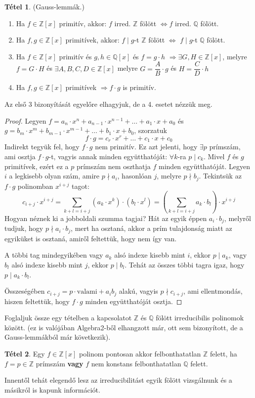 \documentclass[12pt]{book}
\theoremstyle{plain} %
\theoremstyle{definition} %
\newtheorem{theo/}{Tétel}[section]
\newenvironment{theo}
  {\renewcommand{\qedsymbol}{$\clubsuit$}%
   \pushQED{\qed}\begin{theo/}}
  {\popQED\end{theo/}}
\theoremstyle{remark}
\renewcommand\qedsymbol{$\blacksquare$}
\numberwithin{equation}{section}  %
\def\Z{\mathbb{Z}}
\begin{document}
	\begin{theo}\label{gl}
		(Gauss-lemmák.)
		\begin{enumerate}
			\item Ha $f\in \mathbb{Z}[x]$ primitív, akkor: $f$ irred. $\mathbb{Z}$ fölött $\Leftrightarrow f$ irred. $\mathbb{Q}$ fölött.
			\item Ha $f,g\in \mathbb{Z}[x]$ primitívek, akkor: $f\mid g$-t $\mathbb{Z}$ fölött $\Leftrightarrow$ $f\mid g$-t $\mathbb{Q}$ fölött.
			\item Ha $f\in \mathbb{Z}[x]$ primitív és $g,h\in \mathbb{Q}[x]$ és $f=g\cdot h$ $\Rightarrow \exists G,H\in \mathbb{Z}[x]$, melyre $f=G\cdot H$ és $\exists A, B, C, D\in \Z[x]$ melyre $G=\dfrac{A}{B}\cdot g$ és $H=\dfrac{C}{D}\cdot h$
			\item Ha $f,g \in \mathbb{Z}[x]$ primitívek $\Rightarrow f\cdot g$ is primitív.
		\end{enumerate}
	\end{theo}
	Az első 3 bizonyítását egyelőre elhagyjuk, de a 4. esetet nézzük meg.
	\begin{proof}
		Legyen $f=a_n\cdot x^n + a_{n-1}\cdot x^{n-1} + \ldots + a_1\cdot x + a_0$ és $g=b_m\cdot x^m + b_{m-1}\cdot x^{m-1} + \ldots + b_1\cdot x + b_0$, szorzatuk
		\[ f\cdot g = c_r\cdot x^r + \ldots + c_1 \cdot x + c_0  \]
		Indirekt tegyük fel, hogy $f\cdot g$ nem primitív. Ez azt jelenti, hogy $\exists p$ prímszám, ami osztja $f\cdot g$-t, vagyis annak minden együtthatóját: $\forall k$-ra $p \mid c_k$. Mivel $f$ és $g$ primitívek, ezért ez a $p$ prímszám nem oszthatja $f$ minden együtthatóját. Legyen $i$ a legkisebb olyan szám, amire $p \nmid a_i$, hasonlóan $j$, melyre $p \nmid b_j$.
		Tekintsük az $f\cdot g$ polinomban $x^{i+j}$ tagot:
		\[ c_{i+j} \cdot x^{i+j}= \displaystyle\sum_{k+l=i+j} {(a_k\cdot x^k)\cdot (b_l\cdot x^l)} = \left( \displaystyle\sum_{k+l=i+j} a_k \cdot b_l \right) \cdot x^{i+j} \]
		Hogyan néznek ki a jobboldali szumma tagjai? Hát az egyik éppen $a_i\cdot b_j$, melyről tudjuk, hogy $p \nmid a_i\cdot b_j$, mert ha osztaná, akkor a prím tulajdonság miatt az egyiküket is osztaná, amiről feltettük, hogy nem így van.
		
		A többi tag mindegyikében vagy $a_k$ alsó indexe kisebb mint $i$, ekkor $p\mid a_k$, vagy $b_l$ alsó indexe kisebb mint $j$, ekkor $p\mid b_l$. Tehát az összes többi tagra igaz, hogy $p\mid a_k\cdot b_l$.
		
		Összeségében $c_{i+j} = p\cdot \text{valami} + a_i b_j$ alakú, vagyis $p \nmid c_{i+j}$, ami ellentmondás, hiszen feltettük, hogy $f\cdot g$ minden együtthatóját osztja.
	\end{proof}
	Foglaljuk össze egy tételben a kapcsolatot $\mathbb{Z}$ és $\mathbb{Q}$ fölött irreducibilis polinomok között. (ez is valójában Algebra2-ből elhangzott már, ott sem bizonyított, de a Gauss-lemmákból már következik).
	\begin{theo}
		Egy $f\in \mathbb{Z}[x]$ polinom pontosan akkor felbonthatatlan $\mathbb{Z}$ felett, ha $f=p\in \mathbb{Z}$ prímszám \textbf{vagy} $f$ nem konstans felbonthatatlan $\mathbb{Q}$ felett.
	\end{theo}
	Innentől tehát elegendő lesz az irreducibilitást egyik fölött vizsgálnunk és a másikról is kapunk információt.
	
\end{document}

